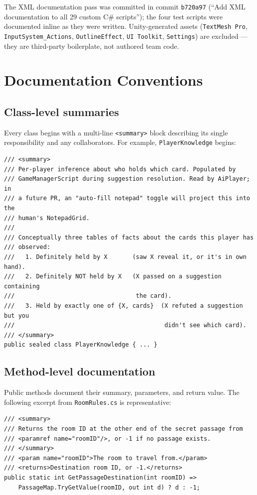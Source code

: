 The XML documentation pass was committed in commit \texttt{b720a97}
(``Add XML documentation to all 29 custom C\# scripts''); the four test
scripts were documented inline as they were written. Unity-generated assets
(\texttt{TextMesh Pro}, \texttt{InputSystem\_Actions}, \texttt{OutlineEffect},
\texttt{UI Toolkit}, \texttt{Settings}) are excluded --- they are third-party
boilerplate, not authored team code.

\section{Documentation Conventions}

\subsection*{Class-level summaries}

Every class begins with a multi-line \texttt{<summary>} block describing its
single responsibility and any collaborators. For example, \texttt{PlayerKnowledge}
begins:

\begin{verbatim}
/// <summary>
/// Per-player inference about who holds which card. Populated by
/// GameManagerScript during suggestion resolution. Read by AiPlayer; in
/// a future PR, an "auto-fill notepad" toggle will project this into the
/// human's NotepadGrid.
///
/// Conceptually three tables of facts about the cards this player has
/// observed:
///   1. Definitely held by X       (saw X reveal it, or it's in own hand).
///   2. Definitely NOT held by X   (X passed on a suggestion containing
///                                  the card).
///   3. Held by exactly one of {X, cards}  (X refuted a suggestion but you
///                                          didn't see which card).
/// </summary>
public sealed class PlayerKnowledge { ... }
\end{verbatim}

\subsection*{Method-level documentation}

Public methods document their summary, parameters, and return value. The
following excerpt from \texttt{RoomRules.cs} is representative:

\begin{verbatim}
/// <summary>
/// Returns the room ID at the other end of the secret passage from
/// <paramref name="roomID"/>, or -1 if no passage exists.
/// </summary>
/// <param name="roomID">The room to travel from.</param>
/// <returns>Destination room ID, or -1.</returns>
public static int GetPassageDestination(int roomID) =>
    PassageMap.TryGetValue(roomID, out int d) ? d : -1;
\end{verbatim}


